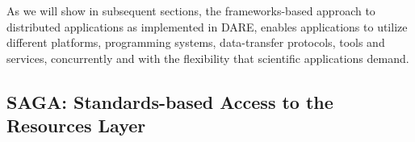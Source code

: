 \documentclass[]{svjour3}
\begin{document}
% 

   

As we will show in subsequent sections, the frameworks-based approach
to distributed applications as implemented in DARE, enables
applications to utilize different platforms, programming systems,
data-transfer protocols, tools and services, concurrently and with the
flexibility that scientific applications demand.



\subsection{SAGA: Standards-based Access to the Resources Layer}
\end{document}
